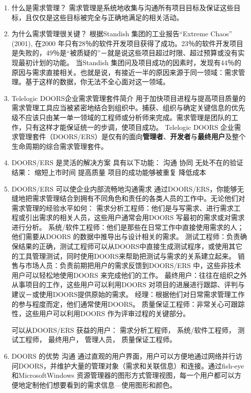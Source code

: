 \documentclass[UTF8]{ctexart}
\begin{document}
	\begin{enumerate}
		\item 什么是需求管理？
		需求管理是系统地收集与沟通所有项目目标及保证这些目标，且仅仅是这些目标被完全与正确地满足的相关活动。
		
		\item 为什么需求管理很关键？
		根据Standish 集团的工业报告“Extreme Chaos” (2001), 在2000 年只有28％的软件开发项目获得了成功。23％的软件开发项目是失败的，49％是“被质疑的”－就是说这些项目超过时限、超过预算或没有实现最初计划的功能。
		当Standish 集团问及项目成功的因素时，发现有44％的原因与需求直接相关。也就是说，有接近一半的原因来源于同一领域：需求管理。基于这样的数据，你无法不全心面对这一领域。
		
		\item Telelogic DOORS企业需求管理套件简介
		用于加快项目进程与提高项目质量的需求管理工具应当被紧密地结合到组织中。捕获、组织与确定关键信息的优先级不应该只由某一单一领域的工程师或分析师来完成。需求管理是团队的工作，只有这样才能保证统一的步调，使项目成功。
		Telelogic DOORS 企业需求管理套件（DOORS/ERS）是仅有的面向\textbf{管理者}、\textbf{开发者}与\textbf{最终用户}及整个生命周期的综合需求管理套件。
	
		\item DOORS/ERS 是灵活的解决方案
		具有以下功能：
		沟通
		协同
		无处不在的验证
		结果：
		缩短上市时间
		提高质量
		项目的成功能够被重复
		降低成本
		
		\item DOORS/ERS 可以使企业内部流畅地沟通需求
		通过DOORS/ERS，你能够无缝地把需求管理结合到拥有不同角色和责任的各类人员的工作中。无论他们对需求管理的经验水平如何：
		\subitem 需求分析工程师：他们是与写需求、进行需求工程或引出需求的相关人员，这些用户通常会用DOORS 写最初的需求或对需求进行分析。
		\subitem 系统/软件工程师：他们是那些在日常工作中直接使用需求的人；他们需要从DOORS 的数据中推导出与设计相关的需求。
		\subitem 测试工程师：负责确保结果的正确，测试工程师可以从DOORS中直接生成测试程序，或使用其它的工具管理测试，同时使用DOORS来帮助把测试与需求的关系建立起来。
		\subitem 销售与市场人员：负责前期把用户的需求反馈到DOORS/ERS 中，这些非技术用户可以轻松地使用DOORS 来完成他们的工作。
		\subitem 最终用户：往往在组织之外从事项目的工作，这些用户可以利用DOORS 对项目的进展进行跟踪、评判与建议－或使用DOORS提供原始的需求。
		\subitem 经理：根据他们对日常需求管理工作的参与程度而定，他们通常使用DOORS。
		\subitem 质量保证工程师：非常关心可跟踪性，这些用户可以利用DOORS 作为评审过程的关键部分。
		
		可以从DOORS/ERS 获益的用户：
		需求分析工程师，
		系统/软件工程师，
		测试工程师，
		最终用户，
		管理人员，	
		质量保证工程师。
	
		\item DOORS 的优势
		沟通
		通过直观的用户界面，用户可以方便地通过网络并行访问DOORS，并维护大量的管理对象（需求和关联信息）和连接。通过fish-eye 和MicrosoftWindows 资源管理器的图形方式管理视图，每一个用户都可以方便地定制他们想要看到的需求信息—使用图形和颜色。
	\end{enumerate}
\end{document}
